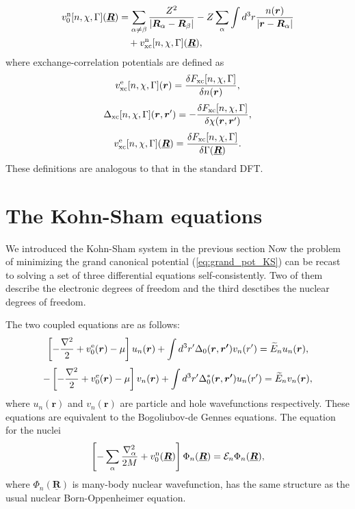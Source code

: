 %
\begin{equation} %
\begin{split}
	v^{\rm n}_0[n, \chi, \Gamma](\underline{\bm{R}}) &= \sum_{\alpha \neq \beta}
											\frac{Z^2}{|\bm{R}_\alpha - \bm{R}_\beta|}
										- Z\sum_{\alpha} \int d^3r \frac{n(\bm{r})}{|\bm{r} - \bm{R}_\alpha|} \\
										&\quad + v^{\rm n}_{\rm xc}[n, \chi, \Gamma](\underline{\bm{R}}),
\end{split}
\end{equation}
%
where exchange-correlation potentials are defined as 
%
\begin{equation}
	v^{\rm e}_{\rm xc}[n, \chi, \Gamma]({\bm r}) = \frac{\delta F_{\rm xc}[n, \chi, \Gamma]}{\delta n({\bm r})},
\end{equation}
%
\begin{equation}
	\Delta_{\rm xc}[n, \chi, \Gamma]({\bm r}, {\bm r'}) = - \frac{\delta F_{\rm xc}[n, \chi, \Gamma]}
							    {\delta \chi({\bm r}, {\bm r'})},
	\label{eq:Deltaxc}
\end{equation}
%
\begin{equation}
	v^{\rm e}_{\rm xc}[n, \chi, \Gamma](\underline{\bm{R}}) = \frac{\delta F_{\rm xc}[n, \chi, \Gamma]}
												{\delta \Gamma(\underline{\bm R})}.
\end{equation}
%
These definitions are analogous to that in the standard DFT.
%
%
\section{The Kohn-Sham equations}
%
We introduced the Kohn-Sham system in the previous section 
Now the problem of minimizing the grand canonical potential (\ref{eq:grand_pot_KS}) can be recast to
solving a set of three differential equations self-consistently.
Two of them describe the electronic degrees of freedom and the third desctibes the nuclear degrees of freedom.
%

The two coupled equations are as follows:
%
\begin{equation}
	\left[-\frac{\nabla^2}{2} + v^{\rm e}_0(\bm{r}) - \mu \right]u_n(\bm{r}) +
	\int d^3r'\Delta_0(\bm{r},\bm{r'})v_n({r'}) = \widetilde{E}_n u_n(\bm{r}),
	\label{eq:KS-BdG-par}
\end{equation}
%
\begin{equation}
	-\left[-\frac{\nabla^2}{2} + v^{\rm e}_0(\bm{r}) - \mu \right]v_n(\bm{r}) +
	\int d^3r'\Delta^{\ast}_0(\bm{r},\bm{r'})u_n({r'}) = \widetilde{E}_n v_n(\bm{r}),
	\label{eq:KS-BdG-hole}
\end{equation}
%
where $u_n(\bm{r})$ and $v_n(\bm{r})$ are particle and hole wavefunctions respectively.
These equations are equivalent to the Bogoliubov-de Gennes equations\cite{BdG1958}. %
The equation for the nuclei
%
\begin{equation}
	\left[-\sum_{\alpha}\frac{\nabla^2_\alpha}{2M} + v^{\rm n}_0(\underline{\bm{R}}) \right]
	\Phi_n(\underline{\bm{R}}) = {\mathcal E}_n\Phi_n(\underline{\bm{R}}),
	\label{eq:BO-approx}
\end{equation}
%
where $\Phi_n(\underline{\bm{R}})$ is many-body nuclear wavefunction, has the same structure as 
the usual nuclear Born-Oppenheimer equation.
%

